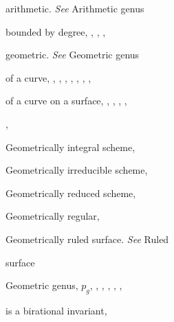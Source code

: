{{\noindent\hspace*{7.5bp}arithmetic. \emph{See} Arithmetic genus\par
\noindent\hspace*{7.5bp}bounded by degree, , , , \par
\noindent\hspace*{7.5bp}geometric. \emph{See} Geometric genus\par
\noindent\hspace*{7.5bp}of a curve, , , , , , , ,\par
\noindent\hspace*{15.0bp}\par
\noindent\hspace*{7.5bp}of a curve on a surface, , , , ,\par
\noindent\hspace*{15.0bp}, \par
\noindent\hspace*{0.0bp}Geometrically integral scheme, \par
\noindent\hspace*{0.0bp}Geometrically irreducible scheme, \par
\noindent\hspace*{0.0bp}Geometrically reduced scheme, \par
\noindent\hspace*{0.0bp}Geometrically regular, \par
\noindent\hspace*{0.0bp}Geometrically ruled surface. \emph{See} Ruled\par
\noindent\hspace*{15.0bp}surface\par
\noindent\hspace*{0.0bp}Geometric genus, $p_g$, , , , , ,\par
\noindent\hspace*{15.0bp}\par
\noindent\hspace*{7.5bp}is a birational invariant, \par
}}
